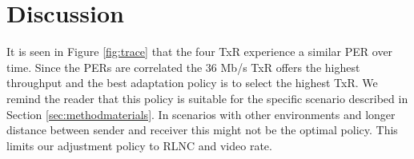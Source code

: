 \section{Discussion}\label{sec:discussion}

It is seen in Figure \ref{fig:trace} that the four TxR experience a similar PER over time. Since the PERs are correlated the 36 Mb/s TxR offers the highest throughput and the best adaptation policy is to select the highest TxR. We remind the reader that this policy is suitable for the specific scenario described in Section \ref{sec:methodmaterials}. In scenarios with other environments and longer distance between sender and receiver this might not be the optimal policy. This limits our adjustment policy to RLNC and video rate.


